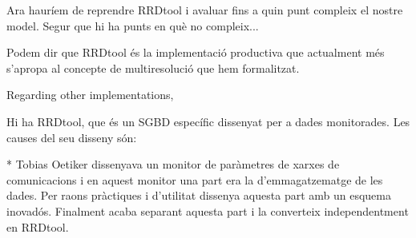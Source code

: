 

Ara hauríem de reprendre RRDtool i avaluar fins a quin punt compleix el nostre model. 
Segur que hi ha punts en què no compleix... 

Podem dir que RRDtool és la implementació productiva que actualment més s'apropa al concepte de multiresolució que hem formalitzat.


Regarding other implementations,














Hi ha RRDtool, que és un SGBD específic dissenyat per a dades monitorades. Les causes del seu disseny són:

* Tobias Oetiker dissenyava un monitor de paràmetres de xarxes de comunicacions i en aquest monitor una part era la d'emmagatzematge de les dades. Per raons pràctiques i d'utilitat dissenya aquesta part amb un esquema inovadós. Finalment acaba separant aquesta part i la converteix independentment en RRDtool.

